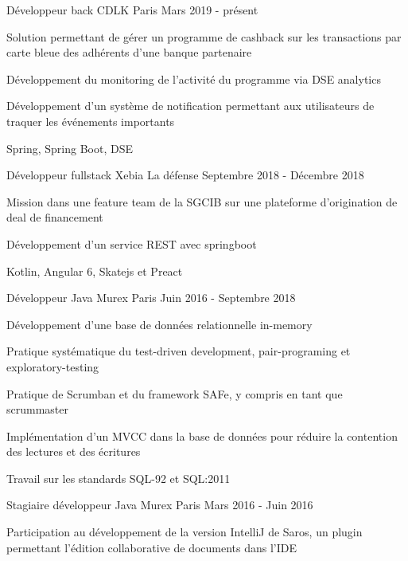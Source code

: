 
\begin{cventries}

\cventry
{Développeur back}
{CDLK}
{Paris}
{Mars 2019 - présent}
{
	\begin{cvitems}
	\item{Solution permettant de gérer un programme de cashback sur les transactions par carte bleue des adhérents d'une banque partenaire}
	\item{Développement du monitoring de l'activité du programme via DSE analytics}
	\item{Développement d'un système de notification permettant aux utilisateurs de traquer les événements importants}
	\item{Spring, Spring Boot, DSE}
	\end{cvitems}
}

\cventry
{Développeur fullstack}
{Xebia}
{La défense}
{Septembre 2018 - Décembre 2018}
{
	\begin{cvitems}
	\item{Mission dans une feature team de la SGCIB sur une plateforme d'origination de deal de financement}
	\item{Développement d'un service REST avec springboot}
	\item{Kotlin, Angular 6, Skatejs et Preact}
	\end{cvitems}
}

\cventry
{Développeur Java}
{Murex}
{Paris}
{Juin 2016 - Septembre 2018}
{
	\begin{cvitems}
	\item{Développement d'une base de données relationnelle in-memory}
	\item{Pratique systématique du test-driven development, pair-programing et exploratory-testing}
	\item{Pratique de Scrumban et du framework SAFe, y compris en tant que scrummaster}
	\item{Implémentation d'un MVCC dans la base de données pour réduire la contention des lectures et des écritures}
	\item{Travail sur les standards SQL-92 et SQL:2011}
	\end{cvitems}
}

\cventry
{Stagiaire développeur Java}
{Murex}
{Paris}
{Mars 2016 - Juin 2016}
{
	\begin{cvitems}
	\item{Participation au développement de la version IntelliJ de Saros, un plugin permettant l'édition collaborative de documents dans l'IDE}
	\end{cvitems}
}


\end{cventries}
